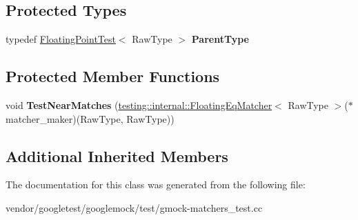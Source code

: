 \subsection*{Protected Types}
\begin{DoxyCompactItemize}
\item 
\mbox{\label{classtesting_1_1gmock__matchers__test_1_1_floating_point_near_test_ac767d2bf3e518d1e7cf9dfafc76cc53a}} 
typedef \mbox{\hyperlink{classtesting_1_1gmock__matchers__test_1_1_floating_point_test}{Floating\+Point\+Test}}$<$ Raw\+Type $>$ {\bfseries Parent\+Type}
\end{DoxyCompactItemize}
\subsection*{Protected Member Functions}
\begin{DoxyCompactItemize}
\item 
\mbox{\label{classtesting_1_1gmock__matchers__test_1_1_floating_point_near_test_a712b564197ab76f58d345c5e3e73955d}} 
void {\bfseries Test\+Near\+Matches} (\mbox{\hyperlink{classtesting_1_1internal_1_1_floating_eq_matcher}{testing\+::internal\+::\+Floating\+Eq\+Matcher}}$<$ Raw\+Type $>$($\ast$matcher\+\_\+maker)(Raw\+Type, Raw\+Type))
\end{DoxyCompactItemize}
\subsection*{Additional Inherited Members}


The documentation for this class was generated from the following file\+:\begin{DoxyCompactItemize}
\item 
vendor/googletest/googlemock/test/gmock-\/matchers\+\_\+test.\+cc\end{DoxyCompactItemize}
